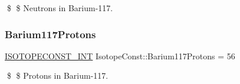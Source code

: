\$ \$ Neutrons in Barium-\/117. \mbox{\label{group___isotope_const-_barium-_ba117_ga26bd7477dc2f6bc35138b65e3eec74ca}} 
\subsubsection{\texorpdfstring{Barium117\+Protons}{Barium117Protons}}
{\footnotesize\ttfamily \mbox{\hyperlink{group___isotope_const-_macros_ga5f18360b3e99483a35c32d789e62621c}{I\+S\+O\+T\+O\+P\+E\+C\+O\+N\+S\+T\+\_\+\+I\+NT}} Isotope\+Const\+::\+Barium117\+Protons = 56}

\$ \$ Protons in Barium-\/117. 